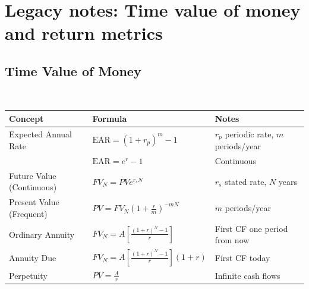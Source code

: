 \documentclass[a4paper,oneside,openany]{book}
\begin{document}
\chapter*{Legacy notes: Time value of money and return metrics}

\section*{Time Value of Money}

\begin{definition} \\
\begin{tabular}{p{4.6cm}p{5.5cm}p{5cm}}
\hline
\textbf{Concept} & \textbf{Formula} & \textbf{Notes} \\
\hline
Expected Annual Rate & $\text{EAR} = (1 + r_p)^m - 1$ & $r_p$ periodic rate, $m$ periods/year \\
& $\text{EAR} = e^r - 1$ & Continuous \\
\hline
Future Value (Continuous) & $FV_N = PV e^{r_s N}$ & $r_s$ stated rate, $N$ years \\
\hline
Present Value (Frequent) & $PV = FV_N (1 + \frac{r}{m})^{-mN}$ & $m$ periods/year \\
\hline
Ordinary Annuity & $FV_N = A \left[ \frac{(1+r)^N - 1}{r} \right]$ & First CF one period from now \\
\hline
Annuity Due & $FV_N = A \left[ \frac{(1+r)^N - 1}{r} \right] (1+r)$ & First CF today \\
\hline
Perpetuity & $PV = \frac{A}{r}$ & Infinite cash flows \\
\hline
\end{tabular}
\end{definition}
\end{document}
